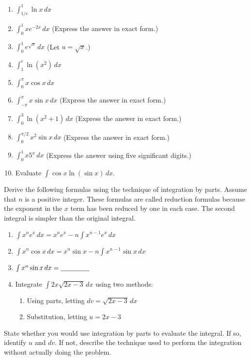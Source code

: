 \documentclass{exercises}
\begin{document}
\begin{enumerate}[resume]
\item $\int_{1/e}^{1}\ln x\,dx$
\item $\int_{0}^{1}xe^{-2x}\,dx$ (Express the answer in exact form.)
\item $\int_{0}^{1}e^{\sqrt{x}}\,dx$ (Let $u=\sqrt{x}$.)
\item $\int_{1}^{e}\ln(x^{2})\,dx$
\item $\int_{0}^{\pi}x\cos x\,dx$
\item $\int_{-\pi}^{\pi}x\sin x\,dx$ (Express the answer in exact form.)
\item $\int_{0}^{3}\ln(x^{2}+1)\,dx$ (Express the answer in exact form.)
\item $\int_{0}^{\pi/2}x^{2}\sin x\,dx$ (Express the answer in exact form.)
\item $\int_{0}^{1}x5^{x}\,dx$ (Express the answer using five significant digits.)
\item Evaluate $\int \cos x\ln(\sin x)\,dx$.
\end{enumerate}

Derive the following formulas using the technique of integration by parts. Assume that $n$ is a positive integer. These formulas are called reduction formulas because the exponent in the $x$ term has been reduced by one in each case. The second integral is simpler than the original integral.

\begin{enumerate}[resume]
\item $\int x^{n}e^{x}\,dx=x^{n}e^{x}-n\int x^{n-1}e^{x}\,dx$
\item $\int x^{n}\cos x\,dx=x^{n}\sin x-n\int x^{n-1}\sin x\,dx$
\item $\int x^{n}\sin x\,dx=\underline{\hspace{1.5cm}}$
\item Integrate $\int 2x\sqrt{2x-3}\,dx$ using two methods:
\begin{enumerate}[label=(\alph*)]
  \item Using parts, letting $dv=\sqrt{2x-3}\,dx$
  \item Substitution, letting $u=2x-3$
\end{enumerate}
\end{enumerate}

State whether you would use integration by parts to evaluate the integral. If so, identify $u$ and $dv$. If not, describe the technique used to perform the integration without actually doing the problem.
\end{document}
